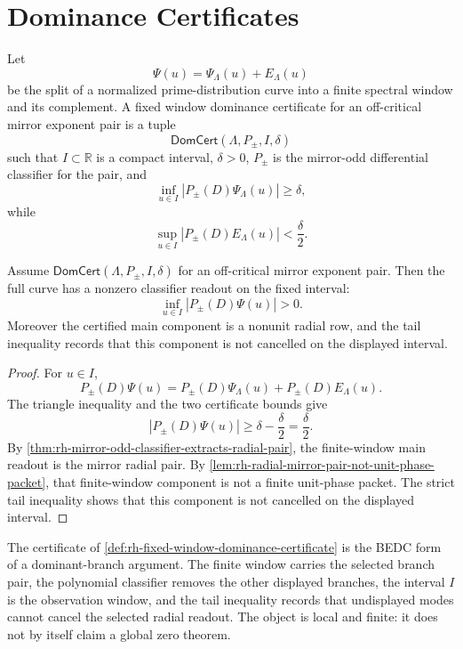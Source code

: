 \section{Dominance Certificates}
\label{sec:rh-fixed-window-dominance-certificates}

\begin{definition}
\label{def:rh-fixed-window-dominance-certificate}
Let
$$
\Psi(u)=\Psi_\Lambda(u)+E_\Lambda(u)
$$
be the split of a normalized prime-distribution curve into a finite
spectral window and its complement.  A fixed window dominance
certificate for an off-critical mirror exponent pair is a tuple
$$
\mathsf{DomCert}(\Lambda,P_\pm,I,\delta)
$$
such that $I\subset\mathbb R$ is a compact interval, $\delta>0$,
$P_\pm$ is the mirror-odd differential classifier for the pair, and
$$
\inf_{u\in I}
\left|
P_\pm(D)\Psi_\Lambda(u)
\right|
\ge\delta,
$$
while
$$
\sup_{u\in I}
\left|
P_\pm(D)E_\Lambda(u)
\right|
<
\frac{\delta}{2}.
$$
\end{definition}

\begin{theorem}
\label{thm:rh-dominance-certificate-audited-radial-readout}
Assume $\mathsf{DomCert}(\Lambda,P_\pm,I,\delta)$ for an off-critical
mirror exponent pair.  Then the full curve has a nonzero classifier
readout on the fixed interval:
$$
\inf_{u\in I}
\left|
P_\pm(D)\Psi(u)
\right|
>
0.
$$
Moreover the certified main component is a nonunit radial row, and the
tail inequality records that this component is not cancelled on the
displayed interval.
\end{theorem}

\begin{proof}
For $u\in I$,
$$
P_\pm(D)\Psi(u)
=
P_\pm(D)\Psi_\Lambda(u)
+
P_\pm(D)E_\Lambda(u).
$$
The triangle inequality and the two certificate bounds give
$$
\left|
P_\pm(D)\Psi(u)
\right|
\ge
\delta-\frac{\delta}{2}
=
\frac{\delta}{2}.
$$
By \autoref{thm:rh-mirror-odd-classifier-extracts-radial-pair}, the
finite-window main readout is the mirror radial pair.  By
\autoref{lem:rh-radial-mirror-pair-not-unit-phase-packet}, that
finite-window component is not a finite unit-phase packet.  The strict
tail inequality shows that this component is not cancelled on the
displayed interval.
\end{proof}

\begin{principle}
\label{prin:rh-dominance-fixed-window-audit-row}
The certificate of
\autoref{def:rh-fixed-window-dominance-certificate} is the BEDC form of a
dominant-branch argument.  The finite window carries the selected
branch pair, the polynomial classifier removes the other displayed
branches, the interval $I$ is the observation window, and the tail
inequality records that undisplayed modes cannot cancel the selected
radial readout.  The object is local and finite: it does not by itself
claim a global zero theorem.
\end{principle}

